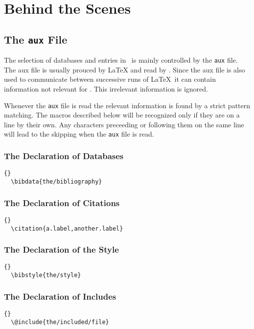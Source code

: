 
\chapter{Behind the Scenes}

\section{The \texttt{aux} File}


 The selection of databases and entries in \ExBib\ is mainly
controlled by the \texttt{aux} file. The aux file is usually prouced
by \LaTeX{} and read by \ExBib. Since the aux file
is also used to communicate between successive runs of \LaTeX\ it can
contain information not relevant for \ExBib. This irrelevant
information is ignored.

Whenever the \texttt{aux} file is read the relevant information is
found by a strict pattern matching. The macros described below will be
recognized only if they are on a line by their own. Any characters
preceeding or following them on the same line will lead to the
skipping when the \texttt{aux} file is read.

\subsection{The Declaration of Databases}
\INCOMPLETE

\begin{lstlisting}{}
  \bibdata{the/bibliography}
\end{lstlisting}

\subsection{The Declaration of Citations}
\INCOMPLETE

\begin{lstlisting}{}
  \citation{a.label,another.label}
\end{lstlisting}

\subsection{The Declaration of the Style}
\INCOMPLETE

\begin{lstlisting}{}
  \bibstyle{the/style}
\end{lstlisting}

\INCOMPLETE

\subsection{The Declaration of Includes}
\begin{lstlisting}{}
  \@include{the/included/file}
\end{lstlisting}

\INCOMPLETE

\endinput
%
